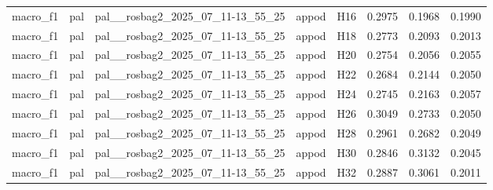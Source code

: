 \begin{table}[tbp]
\begin{tabular}{lllllrrr}
macro\_f1 & pal & pal\_\_rosbag2\_2025\_07\_11-13\_55\_25 & appod & H16 & 0.2975 & 0.1968 & 0.1990 \\
macro\_f1 & pal & pal\_\_rosbag2\_2025\_07\_11-13\_55\_25 & appod & H18 & 0.2773 & 0.2093 & 0.2013 \\
macro\_f1 & pal & pal\_\_rosbag2\_2025\_07\_11-13\_55\_25 & appod & H20 & 0.2754 & 0.2056 & 0.2055 \\
macro\_f1 & pal & pal\_\_rosbag2\_2025\_07\_11-13\_55\_25 & appod & H22 & 0.2684 & 0.2144 & 0.2050 \\
macro\_f1 & pal & pal\_\_rosbag2\_2025\_07\_11-13\_55\_25 & appod & H24 & 0.2745 & 0.2163 & 0.2057 \\
macro\_f1 & pal & pal\_\_rosbag2\_2025\_07\_11-13\_55\_25 & appod & H26 & 0.3049 & 0.2733 & 0.2050 \\
macro\_f1 & pal & pal\_\_rosbag2\_2025\_07\_11-13\_55\_25 & appod & H28 & 0.2961 & 0.2682 & 0.2049 \\
macro\_f1 & pal & pal\_\_rosbag2\_2025\_07\_11-13\_55\_25 & appod & H30 & 0.2846 & 0.3132 & 0.2045 \\
macro\_f1 & pal & pal\_\_rosbag2\_2025\_07\_11-13\_55\_25 & appod & H32 & 0.2887 & 0.3061 & 0.2011 \\
\bottomrule
\end{tabular}
\end{table}

